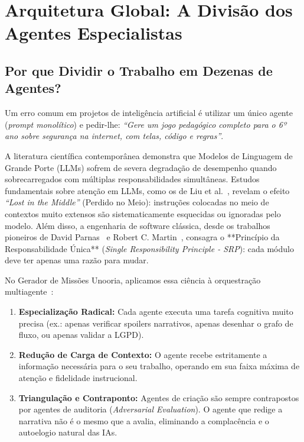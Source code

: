 \documentclass[11pt,a4paper]{article}
\begin{document}
\section{Arquitetura Global: A Divisão dos Agentes Especialistas}
\label{sec:arquitetura}

\subsection{Por que Dividir o Trabalho em Dezenas de Agentes?}
Um erro comum em projetos de inteligência artificial é utilizar um único agente (\textit{prompt monolítico}) e pedir-lhe: \textit{``Gere um jogo pedagógico completo para o 6º ano sobre segurança na internet, com telas, código e regras''}.

A literatura científica contemporânea demonstra que Modelos de Linguagem de Grande Porte (LLMs) sofrem de severa degradação de desempenho quando sobrecarregados com múltiplas responsabilidades simultâneas. Estudos fundamentais sobre atenção em LLMs, como os de Liu et al.~\cite{liu2024lost}, revelam o efeito \textit{``Lost in the Middle''} (Perdido no Meio): instruções colocadas no meio de contextos muito extensos são sistematicamente esquecidas ou ignoradas pelo modelo. Além disso, a engenharia de software clássica, desde os trabalhos pioneiros de David Parnas~\cite{parnas1972criteria} e Robert C. Martin~\cite{martin2002agile}, consagra o **Princípio da Responsabilidade Única** (\textit{Single Responsibility Principle - SRP}): cada módulo deve ter apenas uma razão para mudar.

No Gerador de Missões Unooria, aplicamos essa ciência à orquestração multiagente~\cite{wu2023autogen, hong2024metagpt}:
\begin{enumerate}
  \item \textbf{Especialização Radical:} Cada agente executa uma tarefa cognitiva muito precisa (ex.: apenas verificar spoilers narrativos, apenas desenhar o grafo de fluxo, ou apenas validar a LGPD).
  \item \textbf{Redução de Carga de Contexto:} O agente recebe estritamente a informação necessária para o seu trabalho, operando em sua faixa máxima de atenção e fidelidade instrucional.
  \item \textbf{Triangulação e Contraponto:} Agentes de criação são sempre contrapostos por agentes de auditoria (\textit{Adversarial Evaluation}). O agente que redige a narrativa não é o mesmo que a avalia, eliminando a complacência e o autoelogio natural das IAs.
\end{enumerate}
\end{document}
